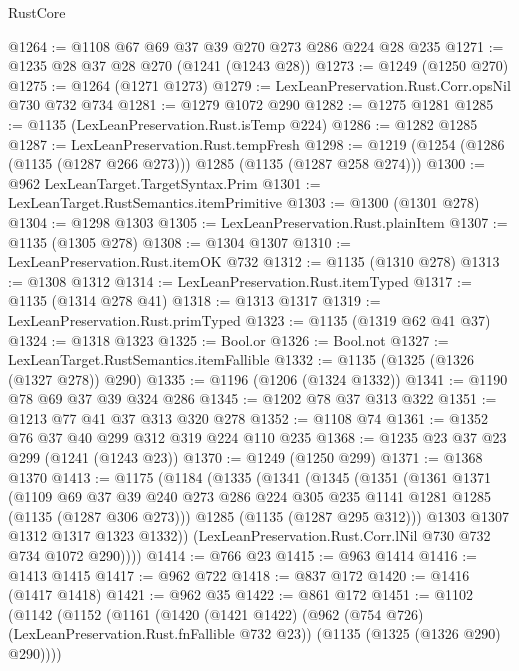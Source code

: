 \begin{lexlean}{RustCore}
\begin{coremodule}
@1264 := @1108 @67 @69 @37 @39 @270 @273 @286 @224 @28 @235
@1271 := @1235 @28 @37 @28 @270 (@1241 (@1243 @28))
@1273 := @1249 (@1250 @270)
@1275 := @1264 (@1271 @1273)
@1279 := LexLeanPreservation.Rust.Corr.opsNil @730 @732 @734
@1281 := @1279 @1072 @290
@1282 := @1275 @1281
@1285 := @1135 (LexLeanPreservation.Rust.isTemp @224)
@1286 := @1282 @1285
@1287 := LexLeanPreservation.Rust.tempFresh
@1298 := @1219 (@1254 (@1286 (@1135 (@1287 @266 @273))) @1285 (@1135 (@1287 @258 @274)))
@1300 := @962 LexLeanTarget.TargetSyntax.Prim
@1301 := LexLeanTarget.RustSemantics.itemPrimitive
@1303 := @1300 (@1301 @278)
@1304 := @1298 @1303
@1305 := LexLeanPreservation.Rust.plainItem
@1307 := @1135 (@1305 @278)
@1308 := @1304 @1307
@1310 := LexLeanPreservation.Rust.itemOK @732
@1312 := @1135 (@1310 @278)
@1313 := @1308 @1312
@1314 := LexLeanPreservation.Rust.itemTyped
@1317 := @1135 (@1314 @278 @41)
@1318 := @1313 @1317
@1319 := LexLeanPreservation.Rust.primTyped
@1323 := @1135 (@1319 @62 @41 @37)
@1324 := @1318 @1323
@1325 := Bool.or
@1326 := Bool.not
@1327 := LexLeanTarget.RustSemantics.itemFallible
@1332 := @1135 (@1325 (@1326 (@1327 @278)) @290)
@1335 := @1196 (@1206 (@1324 @1332))
@1341 := @1190 @78 @69 @37 @39 @324 @286
@1345 := @1202 @78 @37 @313 @322
@1351 := @1213 @77 @41 @37 @313 @320 @278
@1352 := @1108 @74
@1361 := @1352 @76 @37 @40 @299 @312 @319 @224 @110 @235
@1368 := @1235 @23 @37 @23 @299 (@1241 (@1243 @23))
@1370 := @1249 (@1250 @299)
@1371 := @1368 @1370
@1413 := @1175
    (@1184
      (@1335
        (@1341
          (@1345
            (@1351
              (@1361
                @1371
                (@1109
                  @69
                  @37
                  @39
                  @240
                  @273
                  @286
                  @224
                  @305
                  @235
                  @1141
                  @1281
                  @1285
                  (@1135 (@1287 @306 @273)))
                @1285
                (@1135 (@1287 @295 @312)))
              @1303
              @1307
              @1312
              @1317
              @1323
              @1332))
          (LexLeanPreservation.Rust.Corr.lNil @730 @732 @734 @1072 @290))))
@1414 := @766 @23
@1415 := @963 @1414
@1416 := @1413 @1415
@1417 := @962 @722
@1418 := @837 @172
@1420 := @1416 (@1417 @1418)
@1421 := @962 @35
@1422 := @861 @172
@1451 := @1102
    (@1142
      (@1152
        (@1161
          (@1420
            (@1421 @1422)
            (@962 (@754 @726) (LexLeanPreservation.Rust.fnFallible @732 @23))
            (@1135 (@1325 (@1326 @290) @290))))

\end{coremodule}
\end{lexlean}

